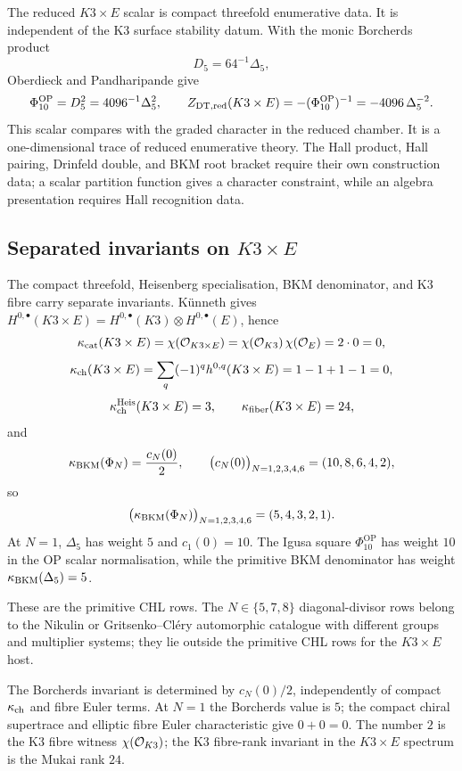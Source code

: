 The reduced $K3\times E$ scalar is compact threefold enumerative data.
It is independent of the K3 surface stability datum.  With the monic
Borcherds product
\[
  D_5=64^{-1}\Delta_5,
\]
Oberdieck and Pandharipande give
\[
  \Phi_{10}^{\mathrm{OP}}
  =D_5^2
  =4096^{-1}\Delta_5^2,
  \qquad
  Z_{\mathrm{DT},\mathrm{red}}(K3\times E)
  =-(\Phi_{10}^{\mathrm{OP}})^{-1}
  =-4096\,\Delta_5^{-2}.
\]
This scalar compares with the graded character in the reduced chamber.
It is a one-dimensional trace of reduced enumerative theory.  The Hall
product, Hall pairing, Drinfeld double, and BKM root bracket require
their own construction data; a scalar partition function gives a
character constraint, while an algebra presentation requires Hall
recognition data.

\subsection*{Separated invariants on $K3\times E$}

The compact threefold, Heisenberg specialisation, BKM denominator, and
K3 fibre carry separate invariants.  K\"unneth gives
$H^{0,\bullet}(K3\times E)=H^{0,\bullet}(K3)\otimes H^{0,\bullet}(E)$,
hence
\[
  \kappa_{\mathrm{cat}}(K3\times E)
  =
  \chi(\mathcal{O}_{K3\times E})
  =
  \chi(\mathcal{O}_{K3})\,\chi(\mathcal{O}_E)
  =
  2\cdot 0
  =
  0,
\]
\[
  \kappa_{\mathrm{ch}}(K3\times E)
  =
  \sum_q(-1)^q h^{0,q}(K3\times E)
  =
  1-1+1-1
  =
  0,
\]
\[
  \kappa_{\mathrm{ch}}^{\mathrm{Heis}}(K3\times E)=3,\qquad
  \kappa_{\mathrm{fiber}}(K3\times E)=24,
\]
and
\[
  \kappa_{\mathrm{BKM}}(\Phi_N)=\frac{c_N(0)}2,\qquad
  \bigl(c_N(0)\bigr)_{N=1,2,3,4,6}=(10,8,6,4,2),
\]
so
\[
  \bigl(\kappa_{\mathrm{BKM}}(\Phi_N)\bigr)_{N=1,2,3,4,6}=(5,4,3,2,1).
\]
At $N=1$, $\Delta_5$ has weight $5$ and $c_1(0)=10$.  The Igusa square
$\Phi_{10}^{\mathrm{OP}}$ has weight $10$ in the OP scalar
normalisation, while the primitive BKM denominator has weight
$\kappa_{\mathrm{BKM}}(\Delta_5)=5$.

These are the primitive CHL rows.  The $N\in\{5,7,8\}$ diagonal-divisor
rows belong to the Nikulin or Gritsenko--Cl\'ery automorphic catalogue
with different groups and multiplier systems; they lie outside the
primitive CHL rows for the $K3\times E$ host.

The Borcherds invariant is determined by $c_N(0)/2$, independently of
compact $\kappa_{\mathrm{ch}}$ and fibre Euler terms.  At $N=1$ the Borcherds value is
$5$; the compact chiral supertrace and elliptic fibre Euler
characteristic give $0+0=0$.  The number $2$ is the K3 fibre witness
$\chi(\mathcal{O}_{K3})$; the K3 fibre-rank invariant in the $K3\times E$
spectrum is the Mukai rank $24$.


